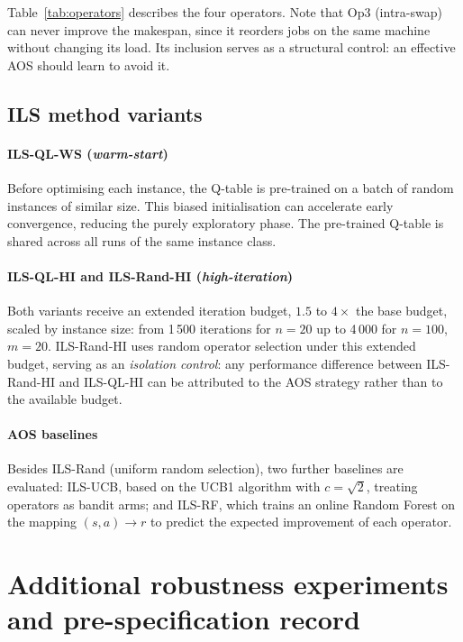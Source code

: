 \documentclass[final,3p,times,11pt,authoryear]{elsarticle}
\begin{document}
Table~\ref{tab:operators} describes the four operators.
Note that Op3 (intra-swap) can never improve the makespan, since it
reorders jobs on the same machine without changing its load.
Its inclusion serves as a structural control: an effective AOS should
learn to avoid it.


\subsection{ILS method variants}
\label{sec:variants}

\paragraph{ILS-QL-WS (\textit{warm-start})}
Before optimising each instance, the Q-table is pre-trained on a batch
of random instances of similar size.
This biased initialisation can accelerate early convergence, reducing
the purely exploratory phase.
The pre-trained Q-table is shared across all runs of the same instance
class.

\paragraph{ILS-QL-HI and ILS-Rand-HI (\textit{high-iteration})}
Both variants receive an extended iteration budget, $1.5$ to
$4{\times}$ the base budget, scaled by instance size: from 1\,500
iterations for $n{=}20$ up to 4\,000 for $n{=}100$, $m{=}20$.
ILS-Rand-HI uses random operator selection under this extended budget,
serving as an \emph{isolation control}: any performance difference
between ILS-Rand-HI and ILS-QL-HI can be attributed to the AOS
strategy rather than to the available budget.

\paragraph{AOS baselines}
Besides ILS-Rand (uniform random selection), two further baselines are
evaluated: ILS-UCB, based on the UCB1 algorithm with $c{=}\sqrt{2}$,
treating operators as bandit arms; and ILS-RF, which trains an online
Random Forest \citep{BreimanRF2001} on the mapping $(s,a) \to r$ to
predict the expected improvement of each operator.


\section{Additional robustness experiments and pre-specification record}
\label{sec:robust}
\end{document}
